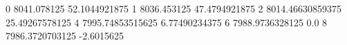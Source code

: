 0 8041.078125 52.1044921875
1 8036.453125 47.4794921875
2 8014.46630859375 25.49267578125
4 7995.74853515625 6.77490234375
6 7988.9736328125 0.0
8 7986.3720703125 -2.6015625
